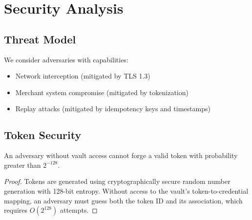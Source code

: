 \section{Security Analysis}


\subsection{Threat Model}

We consider adversaries with capabilities:
\begin{itemize}
    \item Network interception (mitigated by TLS 1.3)
    \item Merchant system compromise (mitigated by tokenization)
    \item Replay attacks (mitigated by idempotency keys and timestamps)
\end{itemize}

\subsection{Token Security}

\begin{theorem}
An adversary without vault access cannot forge a valid token with probability greater than $2^{-128}$.
\end{theorem}

\begin{proof}
Tokens are generated using cryptographically secure random number generation with 128-bit entropy. Without access to the vault's token-to-credential mapping, an adversary must guess both the token ID and its association, which requires $O(2^{128})$ attempts.
\end{proof}

